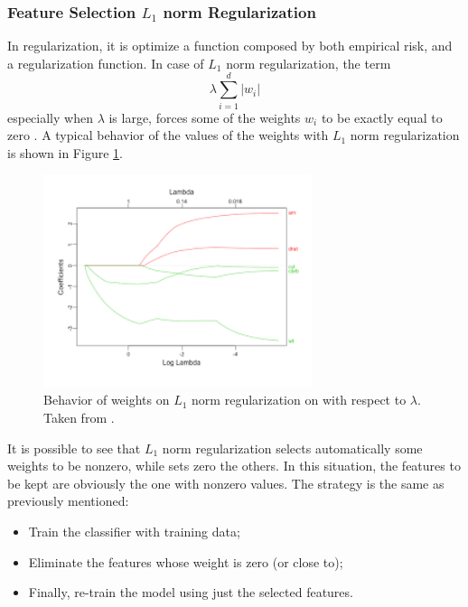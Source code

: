 \subsubsection{Feature Selection $L_1$ norm Regularization}

In regularization, it is optimize a function composed by both empirical risk, and a regularization function. In case of $L_1$ norm regularization, the term
\[ \lambda \sum_{i = 1}^{d} |w_i| \]
especially when $\lambda$ is large, forces some of the weights $w_i$ to be exactly equal to zero \cite{article-lasso}. A typical behavior of the values of the weights with $L_1$ norm regularization is shown in Figure \ref{fig:lasso}.

\begin{figure}[ht]
	\centering
	\includegraphics[width=0.7\textwidth]{figures/lasso.png}
	\caption{Behavior of weights on $L_1$ norm regularization on with respect to $\lambda$. Taken from \cite{Fonti2017PaperIB}.}
	\label{fig:lasso}
\end{figure}

It is possible to see that $L_1$ norm regularization selects automatically some weights to be nonzero, while sets zero the others. In this situation, the features to be kept are obviously the one with nonzero values. The strategy is the same as previously mentioned:

\begin{itemize}
	\item Train the classifier with training data;
	\item Eliminate the features whose weight is zero (or close to);
	\item Finally, re-train the model using just the selected features.
\end{itemize}



